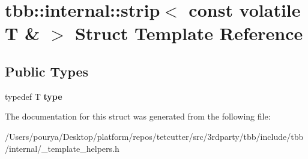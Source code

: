 \hypertarget{structtbb_1_1internal_1_1strip_3_01const_01volatile_01T_01_6_01_4}{}\section{tbb\+:\+:internal\+:\+:strip$<$ const volatile T \& $>$ Struct Template Reference}
\label{structtbb_1_1internal_1_1strip_3_01const_01volatile_01T_01_6_01_4}
\subsection*{Public Types}
\begin{DoxyCompactItemize}
\item 
\hypertarget{structtbb_1_1internal_1_1strip_3_01const_01volatile_01T_01_6_01_4_a9553f37bca4d6ecd879465c8eabd366d}{}typedef T {\bfseries type}\label{structtbb_1_1internal_1_1strip_3_01const_01volatile_01T_01_6_01_4_a9553f37bca4d6ecd879465c8eabd366d}

\end{DoxyCompactItemize}


The documentation for this struct was generated from the following file\+:\begin{DoxyCompactItemize}
\item 
/\+Users/pourya/\+Desktop/platform/repos/tetcutter/src/3rdparty/tbb/include/tbb/internal/\+\_\+template\+\_\+helpers.\+h\end{DoxyCompactItemize}
